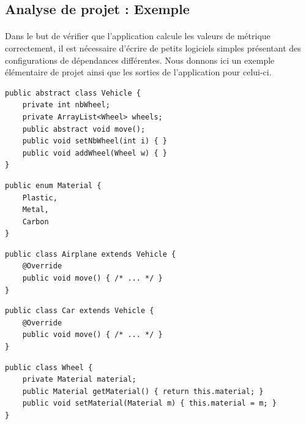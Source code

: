 \documentclass{scrartcl}
\begin{document}
\newpage
\begin{appendices}


\section{Analyse de projet : Exemple}

    \paragraph{}Dans le but de vérifier que l'application calcule les valeurs de métrique correctement, il est nécessaire d'écrire de petits logiciels simples présentant des configurations de dépendances différentes. Nous donnons ici un exemple élémentaire de projet ainsi que les sorties de l'application pour celui-ci.
    
\begin{minipage}{7.5cm}
\begin{lstlisting}[caption=Classe Vehicle]
public abstract class Vehicle {
    private int nbWheel;
    private ArrayList<Wheel> wheels;
    public abstract void move();
    public void setNbWheel(int i) { }
    public void addWheel(Wheel w) { }
}
\end{lstlisting}
\end{minipage}
\hspace{0.5cm}
\begin{minipage}{6cm}
\begin{lstlisting}[caption=Enumeration Material]
public enum Material {
    Plastic,
    Metal,
    Carbon
}
\end{lstlisting}
\end{minipage}
\vspace{0.5cm}
\begin{lstlisting}[caption=Classe Airplane]
public class Airplane extends Vehicle {
    @Override
    public void move() { /* ... */ }
}
\end{lstlisting}
\begin{lstlisting}[caption=Classe Car]
public class Car extends Vehicle {
    @Override
    public void move() { /* ... */ }
}
\end{lstlisting}
\begin{lstlisting}[caption=Classe Wheel]
public class Wheel {
    private Material material;
    public Material getMaterial() { return this.material; }
    public void setMaterial(Material m) { this.material = m; }
}
\end{lstlisting}




\end{appendices}
\end{document}

